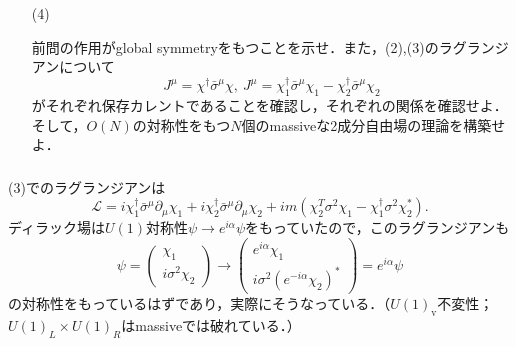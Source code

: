\documentclass[pdflatex,unicode,ja=standard,12pt]{beamer}
\begin{document}
\begin{frame}
  
  \frametitle{\subsecname}

  \begin{itemize}
    
    \item [(4)]

    前問の作用がglobal symmetryをもつことを示せ．また，(2),(3)のラグランジアンについて
    \begin{equation}
      J^{\mu}
      =
      \chi^{\dag}\bar{\sigma}^{\mu}\chi
      ,\ 
      J^{\mu}
      =
      \chi_1^{\dag}\bar{\sigma}^{\mu}\chi_1
      -
      \chi_2^{\dag}\bar{\sigma}^{\mu}\chi_2
      \label{current}
    \end{equation}
    がそれぞれ保存カレントであることを確認し，それぞれの関係を確認せよ．そして，$O(N)$の対称性をもつ$N$個のmassiveな2成分自由場の理論を構築せよ．

  \end{itemize}

\end{frame}


\begin{frame}
  
  \frametitle{\subsecname}

  (3)でのラグランジアンは
  \begin{equation}
    \mathcal{L}
    =
    i\chi^{\dag}_1\bar{\sigma}^{\mu}\partial_{\mu}\chi_1
    +
    i\chi^{\dag}_2\bar{\sigma}^{\mu}\partial_{\mu}\chi_2
    +
    im
    (
      \chi_2^{T}\sigma^2\chi_1
      -
      \chi_1^{\dag}\sigma^2\chi_2^{*}
    )
    .
    \nonumber
  \end{equation}
  ディラック場は$U(1)$対称性$\psi\rightarrow e^{i\alpha}\psi$をもっていたので，このラグランジアンも
  \begin{equation}
    \psi
    =
    \begin{pmatrix}
      \chi_1 \\
      i\sigma^2\chi_2
    \end{pmatrix}
    \rightarrow
    \begin{pmatrix}
      e^{i\alpha}\chi_1 \\
      i\sigma^2(e^{-i\alpha}\chi_2)^{*}
    \end{pmatrix}
    =
    e^{i\alpha}\psi
  \end{equation}
  の対称性をもっているはずであり，実際にそうなっている．（$U(1)_{\mathrm{v}}$不変性；$U(1)_L\times U(1)_R$はmassiveでは破れている．）

\end{frame}
\end{document}
